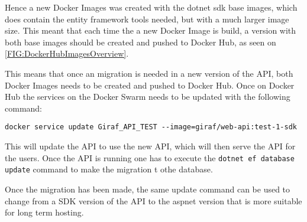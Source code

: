 Hence a new Docker Images was created with the dotnet sdk base images, which does contain the entity framework tools needed, but with a much larger image size. 
This meant that each time the a new Docker Image is build, a version with both base images should be created and pushed to Docker Hub, as seen on \autoref{FIG:DockerHubImagesOverview}. 


This means that once an migration is needed in a new version of the API, both Docker Images needs to be created and pushed to Docker Hub. 
Once on Docker Hub the services on the Docker Swarm needs to be updated with the following command:

\lstinline$docker service update Giraf_API_TEST --image=giraf/web-api:test-1-sdk$

This will update the API to use the new API, which will then serve the API for the users.
Once the API is running one has to execute the \lstinline$dotnet ef database update$ command to make the migration t othe database.

Once the migration has been made, the same update command can be used to change from a SDK version of the API to the aspnet version that is more suitable for long term hosting.




